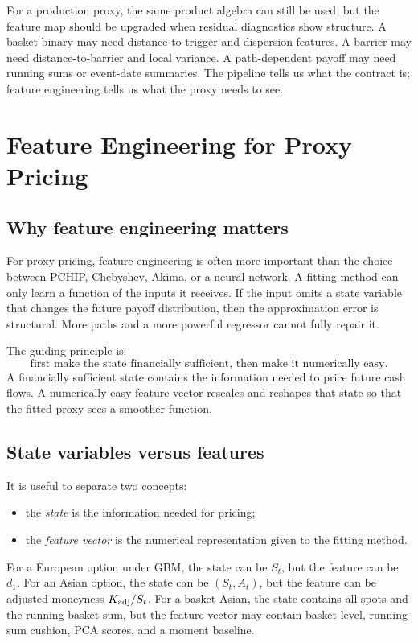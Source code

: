 \documentclass[11pt,oneside]{book}
\theoremstyle{definition}
\begin{document}
For a production proxy, the same product algebra can still be used, but the
feature map should be upgraded when residual diagnostics show structure. A
basket binary may need distance-to-trigger and dispersion features. A barrier
may need distance-to-barrier and local variance. A path-dependent payoff may
need running sums or event-date summaries. The pipeline tells us what the
contract is; feature engineering tells us what the proxy needs to see.

\chapter{Feature Engineering for Proxy Pricing}

\section{Why feature engineering matters}
For proxy pricing, feature engineering is often more important than the choice
between PCHIP, Chebyshev, Akima, or a neural network. A fitting method can only
learn a function of the inputs it receives. If the input omits a state variable
that changes the future payoff distribution, then the approximation error is
structural. More paths and a more powerful regressor cannot fully repair it.

The guiding principle is:
\[
  \text{first make the state financially sufficient, then make it numerically easy.}
\]
A financially sufficient state contains the information needed to price future
cash flows. A numerically easy feature vector rescales and reshapes that state
so that the fitted proxy sees a smoother function.

\section{State variables versus features}
It is useful to separate two concepts:
\begin{itemize}
  \item the \emph{state} is the information needed for pricing;
  \item the \emph{feature vector} is the numerical representation given to the
        fitting method.
\end{itemize}
For a European option under GBM, the state can be \(S_t\), but the feature can
be \(d_1\). For an Asian option, the state can be \((S_t,A_t)\), but the
feature can be adjusted moneyness \(K_{\rm adj}/S_t\). For a basket Asian, the
state contains all spots and the running basket sum, but the feature vector may
contain basket level, running-sum cushion, PCA scores, and a moment baseline.
\end{document}
